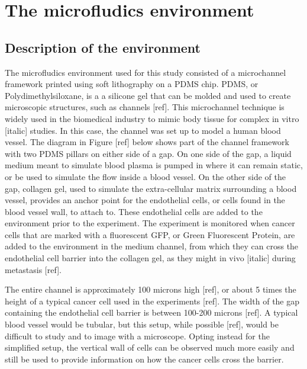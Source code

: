 
\chapter{The microfludics environment}

\ifpdf
    \graphicspath{{Chapter2/Figs/Raster/}{Chapter2/Figs/PDF/}{Chapter2/Figs/}}
\else
    \graphicspath{{Chapter2/Figs/Vector/}{Chapter2/Figs/}}
\fi

\section{Description of the environment}

The microfludics environment used for this study consisted of a microchannel framework printed using soft lithography on a PDMS chip. PDMS, or Polydimethylsiloxane, is a a silicone gel that can be molded and used to create microscopic structures, such as channels [ref]. This microchannel technique is widely used in the biomedical industry to mimic body tissue for complex in vitro [italic] studies. In this case, the channel was set up to model a human blood vessel. The diagram in Figure [ref] below shows part of the channel framework with two PDMS pillars on either side of a gap. On one side of the gap, a liquid medium meant to simulate blood plasma is pumped in where it can remain static, or be used to simulate the flow inside a blood vessel. On the other side of the gap, collagen gel, used to simulate the extra-cellular matrix surrounding a blood vessel, provides an anchor point for the endothelial cells, or cells found in the blood vessel wall, to attach to. These endothelial cells are added to the environment prior to the experiment. The experiment is monitored when cancer cells that are marked with a fluorescent GFP, or Green Fluorescent Protein, are added to the environment in the medium channel, from which they can cross the endothelial cell barrier into the collagen gel, as they might in vivo [italic] during metastasis [ref].

The entire channel is approximately 100 microns high [ref], or about 5 times the height of a typical cancer cell used in the experiments [ref]. The width of the gap containing the endothelial cell barrier is between 100-200 microns [ref]. A typical blood vessel would be tubular, but this setup, while possible [ref], would be difficult to study and to image with a microscope. Opting instead for the simplified setup, the vertical wall of cells can be observed much more easily and still be used to provide information on how the cancer cells cross the barrier.

